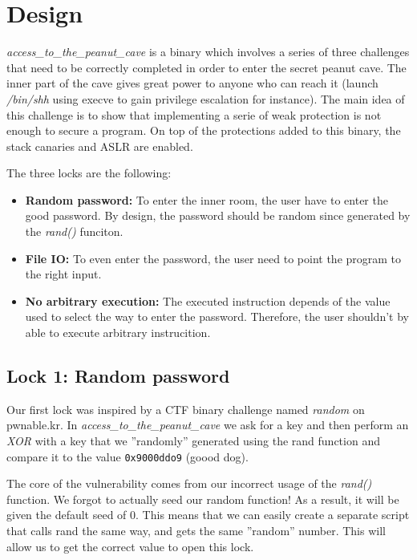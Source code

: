 \section{Design}
\emph{access\_to\_the\_peanut\_cave} is a binary which involves a series of three challenges that need to be correctly completed in order to enter the secret peanut cave. The inner part of the cave gives great power to anyone who can reach it (launch \emph{/bin/shh} using execve to gain privilege escalation for instance). The main idea of this challenge is to show that implementing a serie of weak protection is not enough to secure a program. On top of the protections added to this binary, the stack canaries and ASLR are enabled.

The three locks are the following:

\begin{itemize}
  \item \textbf{Random password:} To enter the inner room, the user have to enter the good password. By design, the password should be random since generated by the \emph{rand()} funciton.

  \item \textbf{File IO:} To even enter the password, the user need to point the program to the right input.
    
  \item \textbf{No arbitrary execution:} The executed instruction depends of the value used to select the way to enter the password. Therefore, the user shouldn't by able to execute arbitrary instrucition.
\end{itemize}

\subsection {Lock 1: Random password}
Our first lock was inspired by a CTF binary challenge named \emph{random} on pwnable.kr. In \emph{access\_to\_the\_peanut\_cave} we ask for a key and then perform an \emph{XOR} with a key that we ''randomly'' generated using the rand function and compare it to the value {\tt0x9000ddo9} (goood dog). 

The core of the vulnerability comes from our incorrect usage of the \emph{rand()} function. We forgot to actually seed our random function! As a result, it will be given the default seed of 0. This means that we can easily create a separate script that calls rand the same way, and gets the same ''random'' number. This will allow us to get the correct value to open this lock. 

